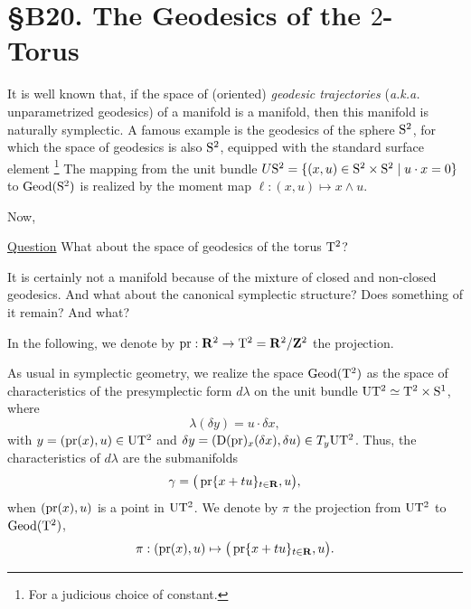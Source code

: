 
\chapter*{\S B20. The Geodesics of the $2$-Torus}
\setcounter{footnote}{0}


\begin{abstract}
  We describe the space of geodesic trajectories of the $2$-torus,
  and we exhibit its natural parasymplectic structure.
\end{abstract}


It is well known that,
if the space of (oriented) \emph{geodesic trajectories} (\emph{a.k.a.} unparametrized geodesics) of a manifold is a manifold,
then this manifold is naturally symplectic.
A famous example is the geodesics of the sphere $\mathrm{S}^2$,
for which the space of geodesics is also $\mathrm{S}^2$, equipped with the standard surface element%
\footnote{For a judicious choice of constant.}
The mapping from the unit bundle $U{\mathrm{S}^2} = \{(x,u)\in \mathrm{S}^2 \times \mathrm{S}^2 \mid u \cdot x = 0\}$ to $\operatorname{Geod}(\mathrm{S}^2)$ is realized by the moment map $\ell : (x,u) \mapsto x \wedge u$.

Now,

\uline{Question} What about the space of geodesics of the torus $\mathrm{T}^2$?

It is certainly not a manifold because of the mixture of closed and non-closed geodesics.
And what about the canonical symplectic structure?
Does something of it remain?
And what?

In the following,
we denote by $\operatorname{pr} : \mathbf{R}^2 \to \mathrm{T}^2 = \mathbf{R}^2/\mathbf{Z}^2$ the projection.

As usual in symplectic geometry,
we realize the space $\operatorname{Geod}(\mathrm{T}^2)$ as the space of characteristics of the presymplectic form $d\lambda$ on the unit bundle $\mathrm{U}\mathrm{T}^2 \simeq \mathrm{T}^2 \times \mathrm{S}^1$,
where
$$
  \lambda (\delta y) = u \cdot \delta x,
  $$
with $y = (\operatorname{pr}(x),u) \in \mathrm{U}\mathrm{T}^2$ and $\delta y = (\operatorname{D}(\operatorname{pr})_x(\delta x), \delta u) \in T_y\mathrm{U}\mathrm{T}^2$.
Thus,
the characteristics of $d\lambda$ are the submanifolds
$$
  \gamma = \big( \operatorname{pr} \{x+tu\}_{t\in \mathbf{R}}, u \big),
  $$
when $(\operatorname{pr}(x),u)$ is a point in $\mathrm{U}\mathrm{T}^2$.
We denote by $\pi$ the projection from $\mathrm{U}\mathrm{T}^2$ to $\operatorname{Geod}(\mathrm{T}^2)$,
$$
  \pi : (\operatorname{pr}(x),u) \mapsto \big( \operatorname{pr} \{x+tu\}_{t\in \mathbf{R}}, u \big).
  $$

